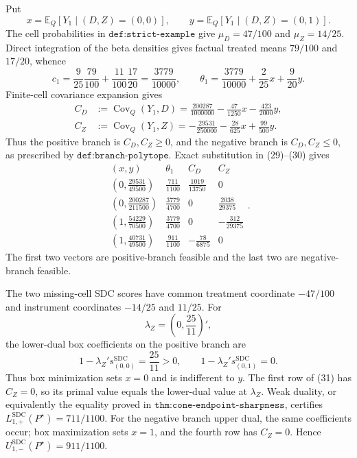 Put
\[
 x=\mathbb E_Q[Y_1\mid(D,Z)=(0,0)],\qquad
 y=\mathbb E_Q[Y_1\mid(D,Z)=(0,1)].
\]
The cell probabilities in \(\texttt{def:strict-example}\) give \(\mu_D=47/100\) and \(\mu_Z=14/25\).  Direct integration of the beta densities gives factual treated means \(79/100\) and \(17/20\), whence
\[
 c_1=\frac{9}{25}\frac{79}{100}+\frac{11}{100}\frac{17}{20}
 =\frac{3779}{10000},
 \qquad
 \theta_1=\frac{3779}{10000}+\frac{2}{25}x+\frac{9}{20}y.                    \tag{29}
\]
Finite-cell covariance expansion gives
\[
 \begin{aligned}
 C_D&:=\operatorname{Cov}_Q(Y_1,D)
 =\frac{200287}{1000000}-\frac{47}{1250}x-\frac{423}{2000}y,\\
 C_Z&:=\operatorname{Cov}_Q(Y_1,Z)
 =-\frac{29531}{250000}-\frac{28}{625}x+\frac{99}{500}y.
 \end{aligned}                                                               \tag{30}
\]
Thus the positive branch is \(C_D,C_Z\ge0\), and the negative branch is \(C_D,C_Z\le0\), as prescribed by \(\texttt{def:branch-polytope}\).  Exact substitution in (29)--(30) gives
\[
\begin{array}{c|c|c|c}
(x,y)&\theta_1&C_D&C_Z\\ \hline
\left(0,\frac{29531}{49500}\right)&\frac{711}{1100}&\frac{1019}{13750}&0\\[2pt]
\left(0,\frac{200287}{211500}\right)&\frac{3779}{4700}&0&\frac{2038}{29375}\\[2pt]
\left(1,\frac{54229}{70500}\right)&\frac{3779}{4700}&0&-\frac{312}{29375}\\[2pt]
\left(1,\frac{40731}{49500}\right)&\frac{911}{1100}&-\frac{78}{6875}&0
\end{array}.                                                                  \tag{31}
\]
The first two vectors are positive-branch feasible and the last two are negative-branch feasible.

The two missing-cell SDC scores have common treatment coordinate \(-47/100\) and instrument coordinates \(-14/25\) and \(11/25\).  For
\[
 \lambda_Z=\left(0,\frac{25}{11}\right)',
\]
the lower-dual box coefficients on the positive branch are
\[
 1-\lambda_Z's_{(0,0)}^{\mathrm{SDC}}=\frac{25}{11}>0,
 \qquad
 1-\lambda_Z's_{(0,1)}^{\mathrm{SDC}}=0.                                     \tag{32}
\]
Thus box minimization sets \(x=0\) and is indifferent to \(y\).  The first row of (31) has \(C_Z=0\), so its primal value equals the lower-dual value at \(\lambda_Z\).  Weak duality, or equivalently the equality proved in \(\texttt{thm:cone-endpoint-sharpness}\), certifies
\(L_{1,+}^{\mathrm{SDC}}(P^\star)=711/1100\).  For the negative branch upper dual, the same coefficients occur; box maximization sets \(x=1\), and the fourth row has \(C_Z=0\).  Hence \(U_{1,-}^{\mathrm{SDC}}(P^\star)=911/1100\).

